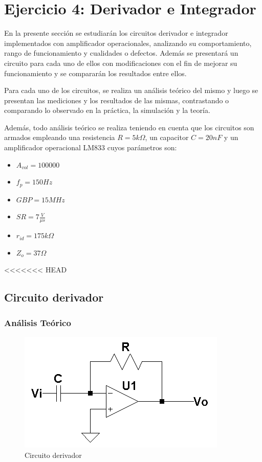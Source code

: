 


\section{Ejercicio 4: Derivador e Integrador}
En la presente secci\'on se estudiar\'an los circuitos derivador e integrador implementados con amplificador operacionales, analizando su comportamiento, rango de funcionamiento y cualidades o defectos. Adem\'as se presentar\'a un circuito para cada uno de ellos con modificaciones con el fin de mejorar su funcionamiento y se comparar\'an los resultados entre ellos.

Para cada uno de los circuitos, se realiza un an\'alisis te\'orico del mismo y luego se presentan las mediciones y los resultados de las mismas, contrastando o comparando lo observado en la pr\'actica, la simulaci\'on y la teor\'ia.

Adem\'as, todo an\'alisis te\'orico se realiza teniendo en cuenta que los circuitos son armados empleando una resistencia $R = 5k \Omega$, un capacitor $C = 20nF$ y un amplificador operacional LM833 cuyos par\'ametros son:
\begin{itemize}
	\item $A_{vol} = 100000$
	\item $f_p = 150Hz$
	\item $GBP = 15MHz$
	\item $SR = 7 \frac{V}{\mu s}$
	\item $r_{id} = 175k \Omega$
	\item $Z_o = 37 \Omega$
\end{itemize}

<<<<<<< HEAD
	\subsection{Circuito derivador}
 
\subsubsection{An\'alisis Te\'orico}

\begin{figure}[H]
	\centering
	\includegraphics[scale=0.8]{Recursos/Derivador/Circuito_derivador.png}
	\caption{Circuito derivador}
	\label{fig:circuito_derivador}
\end{figure}

